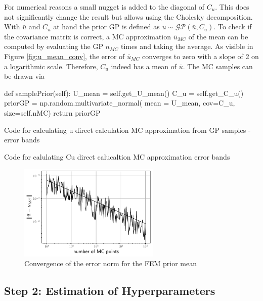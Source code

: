 \documentclass[%
  a4paper,oneside,%
  11pt,%
  smallchapters,
  green,%
  rgb, <cmyk>
  ]{tubsbook}
\begin{document}
For numerical reasons a small nugget is added to the diagonal of $C_u$. This does not significantly change the result but allows using the Cholesky decomposition.
With $\bar{u}$ and $C_u$ at hand the prior GP is defined as $u \sim \mathcal{GP}(\bar{u},C_u)$. To check if the covariance matrix is correct, a MC approximation $\bar{u}_{MC}$ of the mean can be computed by evaluating the GP $n_{MC}$ times and taking the average. As visible in Figure \ref{fig:u_mean_conv}, the error of $\bar{u}_{MC}$ converges to zero with a slope of 2 on a logarithmic scale. Therefore, $C_u$ indeed has a mean of $\bar{u}$.
The MC samples can be drawn via
\begin{python}
def samplePrior(self):
	U_mean = self.get_U_mean()
	C_u = self.get_C_u()
	priorGP = np.random.multivariate_normal(
		mean = U_mean, cov=C_u,
		size=self.nMC)
	return priorGP
\end{python}

Code for calculating u
direct calculation
MC approximation from GP samples
-error bands

Code for calulating Cu
direct calucaltion
MC approximation
error bands


\begin{figure}[h]
\includegraphics[width=0.6\textwidth]{pics/MCerrorConv.pdf}
\centering
\caption{Convergence of the error norm for the FEM prior mean}
\end{figure}
\label{fig:u_mean_conv}



\subsection{Step 2: Estimation of Hyperparameters }
\end{document}
